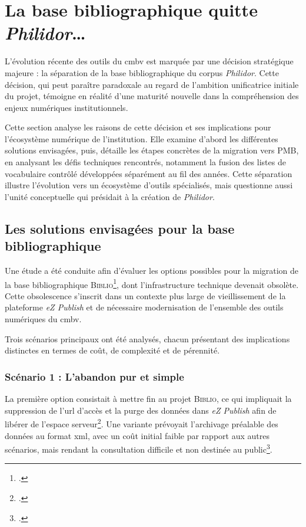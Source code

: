 \section{La base bibliographique quitte \textit{Philidor}…}

L'évolution récente des outils du \gls{cmbv} est marquée par une décision stratégique majeure : la séparation de la base bibliographique du corpus \textit{Philidor}. Cette décision, qui peut paraître paradoxale au regard de l'ambition unificatrice initiale du projet, témoigne en réalité d'une maturité nouvelle dans la compréhension des enjeux numériques institutionnels.

Cette section analyse les raisons de cette décision et ses implications pour l'écosystème numérique de l'institution. Elle examine d'abord les différentes solutions envisagées, puis, détaille les étapes concrètes de la migration vers PMB, en analysant les défis techniques rencontrés, notamment la fusion des listes de vocabulaire contrôlé développées séparément au fil des années. Cette séparation illustre l'évolution vers un écosystème d'outils spécialisés, mais questionne aussi l'unité conceptuelle qui présidait à la création de \textit{Philidor}.

\subsection{Les solutions envisagées pour la base bibliographique}

Une étude a été conduite afin d'évaluer les options possibles pour la migration de la base bibliographique \textsc{Biblio}\footcite{laurentguilloEtudeEvolutionBase2023}, dont l'infrastructure technique devenait obsolète. Cette obsolescence s'inscrit dans un contexte plus large de vieillissement de la plateforme \textit{eZ Publish} et de nécessaire modernisation de l'ensemble des outils numériques du \gls{cmbv}.

Trois scénarios principaux ont été analysés, chacun présentant des implications distinctes en termes de coût, de complexité et de pérennité.

\subsubsection{Scénario 1 : L'abandon pur et simple}

La première option consistait à mettre fin au projet \textsc{Biblio}, ce qui impliquait la suppression de l'\gls{url} d'accès et la purge des données dans \textit{eZ Publish} afin de libérer de l'espace serveur\footcite{laurentguilloEtudeEvolutionBase2023}. Une variante prévoyait l'archivage préalable des données au format \gls{xml}, avec un coût initial faible par rapport aux autres scénarios, mais rendant la consultation difficile et non destinée au public\footcite{laurentguilloEtudeEvolutionBase2023}.

